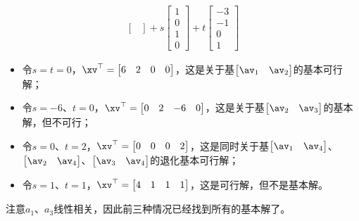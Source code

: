 \documentclass{ctexart}
\begin{document}
\begin{example}
\begin{align*}
\begin{bmatrix}
        \end{bmatrix} + s
        \begin{bmatrix}
            1 \\ 0 \\ 1 \\ 0
        \end{bmatrix} + t
        \begin{bmatrix}
            -3 \\ -1 \\ 0 \\ 1
        \end{bmatrix}
    \end{align*}
    \begin{itemize}
        \item 令$s=t=0$，$\xv^\top = \begin{bmatrix}
                      6 & 2 & 0 & 0
                  \end{bmatrix}$，这是关于基$\begin{bmatrix}
                      \av_1 & \av_2
                  \end{bmatrix}$的基本可行解；
        \item 令$s=-6$、$t=0$，$\xv^\top = \begin{bmatrix}
                      0 & 2 & -6 & 0
                  \end{bmatrix}$，这是关于基$\begin{bmatrix}
                      \av_2 & \av_3
                  \end{bmatrix}$的基本解，但不可行；
        \item 令$s=0$、$t=2$，$\xv^\top = \begin{bmatrix}
                      0 & 0 & 0 & 2
                  \end{bmatrix}$，这是同时关于基$\begin{bmatrix}
                      \av_1 & \av_4
                  \end{bmatrix}$、$\begin{bmatrix}
                      \av_2 & \av_4
                  \end{bmatrix}$、$\begin{bmatrix}
                      \av_3 & \av_4
                  \end{bmatrix}$的退化基本可行解；
        \item 令$s=1$、$t=1$，$\xv^\top = \begin{bmatrix}
                      4 & 1 & 1 & 1
                  \end{bmatrix}$，这是可行解，但不是基本解。
    \end{itemize}
    注意$a_1$、$a_3$线性相关，因此前三种情况已经找到所有的基本解了。
\end{example}
\end{document}
